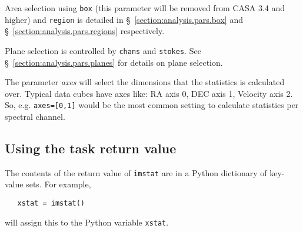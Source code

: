 Area selection using {\tt box} (this parameter will be removed from
CASA 3.4 and higher) and {\tt region} is detailed in 
\S~\ref{section:analysis.pars.box} and
\S~\ref{section:analysis.pars.regions} respectively.

Plane selection is controlled by {\tt chans} and {\tt stokes}.
See \S~\ref{section:analysis.pars.planes} for details on plane
selection.

The parameter {\it axes} will select the dimensions that the
statistics is calculated over. Typical data cubes have axes like: RA
axis 0, DEC axis 1, Velocity axis 2. So, e.g. {\tt axes=[0,1]} would
be the most common setting to calculate statistics per spectral
channel.


\subsection{Using the task return value}
\label{section:analysis.imstat.xstat}

The contents of the return value of {\tt imstat} are in a Python
dictionary of key-value sets.  For example,
\small
\begin{verbatim}
   xstat = imstat()
\end{verbatim}
\normalsize
will assign this to the Python variable {\tt xstat}.

